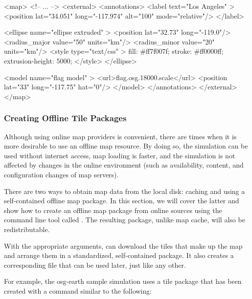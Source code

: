 \begin{xml}
<map>
    <!-- ... -->
    <external>
        <annotations>
            <label text="Los Angeles" >
                <position lat="34.051" long="-117.974" alt="100" mode="relative"/>
            </label>

            <ellipse name="ellipse extruded" >
                <position lat="32.73" long="-119.0"/>
                <radius_major value="50" units="km"/>
                <radius_minor value="20" units="km"/>
                <style type="text/css" >
                    fill:             #ff7f007f;
                    stroke:           #ff0000ff;
                    extrusion-height: 5000;
                </style>
            </ellipse>

            <model name="flag model" >
                <url>flag.osg.18000.scale</url>
                <position lat="33" long="-117.75" hat="0"/>
            </model>
        </annotations>
    </external>
</map>
\end{xml}


\subsubsection{Creating Offline Tile Packages}
\label{sec:graphics:offline-tiles}

Although using online map providers is convenient, there are times when it is
more desirable to use an offline map resource. By doing so, the simulation can
be used without internet access, map loading is faster, and the simulation is
not affected by changes in the online environment (such as availability,
content, and configuration changes of map servers).

There are two ways to obtain map data from the local disk: caching and using a
self-contained offline map package. In this section, we will cover the latter
and show how to create an offline map package from online sources using the
command line tool called . The resulting package,
unlike map cache, will also be redistributable.

With the appropriate arguments,  can download the tiles
that make up the map and arrange them in a standardized, self-contained package.
It also creates a corresponding  file that can be used later, just like
any other.

For example, the osg-earth sample simulation uses a tile package that has been
created with a command similar to the following:

